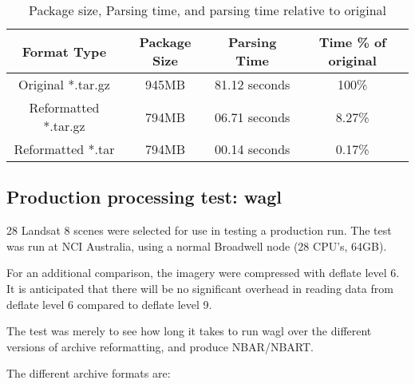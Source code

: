 \documentclass[a4paper]{article}
\begin{document}
    \begin{table}[h!]
      \caption{Package size, Parsing time, and parsing time relative to original}
      \begin{tabular}{|c|c|c|c|}
      \hline
      \textbf{Format Type} & \textbf{Package Size} & \textbf{Parsing Time} & \textbf{Time \% of original} \\ \hline
      Original *.tar.gz & 945MB & 81.12 seconds & 100\% \\ \hline
      Reformatted *.tar.gz & 794MB & 06.71 seconds & 8.27\% \\ \hline
      Reformatted *.tar & 794MB & 00.14 seconds & 0.17\% \\ \hline
      \end{tabular}
    \end{table}

  \subsection{Production processing test: wagl}

    \begin{flushleft}
    28 Landsat 8 scenes were selected for use in testing a production run.  The test was run at NCI Australia, using a normal Broadwell node (28 CPU’s, 64GB). \par
    For an additional comparison, the imagery were compressed with deflate level 6.  It is anticipated that there will be no significant overhead in reading data from deflate level 6 compared to deflate level 9. \par
    The test was merely to see how long it takes to run wagl over the different versions of archive reformatting, and produce NBAR/NBART. \par

    The different archive formats are:
    \end{flushleft}
\end{document}
